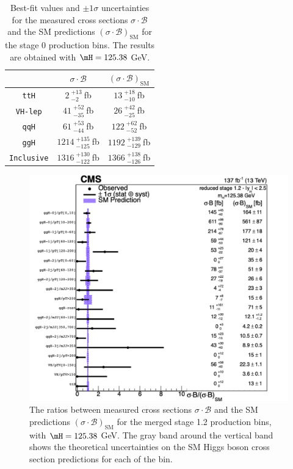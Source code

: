 \begin{table}[hb]
	\begin{center}
		\caption{
		Best-fit values and $\pm 1\sigma$ uncertainties for the measured cross sections $\sigma\cdot\mathcal{B}$ and the SM predictions $(\sigma\cdot\mathcal{B})_{\mathrm{SM}}$ for the stage 0 production bins.
		The results are obtained with $\mH=125.38$ GeV. %
		\label{tab:stage0}
			}
    \renewcommand{\arraystretch}{1.5}
    \begin{tabular}{ccc}
	\hline
	& $\sigma\cdot\mathcal{B}$ & $(\sigma\cdot\mathcal{B})_{\mathrm{SM}}$ \\
	\hline
        {\tt ttH} & $2~^{+13}_{-2}~$fb & $13~^{+18}_{-10}~$fb \\
	{\tt VH-lep} & $41~^{+52}_{-35}~$fb & $26~^{+42}_{-25}~$fb \\
	{\tt qqH} & $61~^{+53}_{-44}~$fb & $122~^{+62}_{-52}~$fb \\
	{\tt ggH} & $1214~^{+135}_{-125}~$fb & $1192~^{+139}_{-129}~$fb \\
    \hline
    {\tt Inclusive} & $1316~^{+130}_{-122}~$fb & $1366~^{+138}_{-126}~$fb  \\
	\hline
	\end{tabular}
 \end{center}
 \end{table}

\begin{figure}[!htb]
\begin{center}
\includegraphics[width=0.9\linewidth]{Figures/results/stxs/stage1p2_125_38.pdf}
\caption{
The ratios between measured cross sections $\sigma\cdot\mathcal{B}$ and the SM predictions $(\sigma\cdot\mathcal{B})_{\mathrm{SM}}$ for the merged stage 1.2 production bins, with $\mH=125.38$ GeV. %
The gray band around the vertical band shows the theoretical uncertainties on the SM Higgs boson cross section predictions for each of the bin.
\label{fig:stxs_1}
}
\end{center}
\end{figure}

